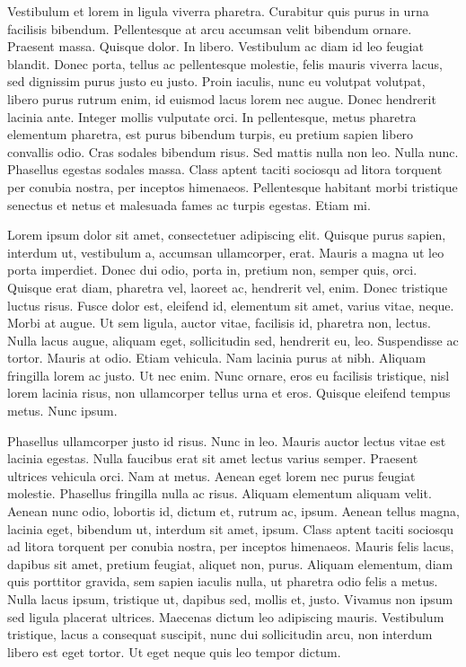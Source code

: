 Vestibulum et lorem in ligula viverra pharetra. Curabitur quis purus
in urna facilisis bibendum. Pellentesque at arcu accumsan velit
bibendum ornare. Praesent massa. Quisque dolor. In libero. Vestibulum
ac diam id leo feugiat blandit. Donec porta, tellus ac pellentesque
molestie, felis mauris viverra lacus, sed dignissim purus justo eu
justo. Proin iaculis, nunc eu volutpat volutpat, libero purus rutrum
enim, id euismod lacus lorem nec augue. Donec hendrerit lacinia
ante. Integer mollis vulputate orci. In pellentesque, metus pharetra
elementum pharetra, est purus bibendum turpis, eu pretium sapien
libero convallis odio. Cras sodales bibendum risus. Sed mattis nulla
non leo. Nulla nunc. Phasellus egestas sodales massa. Class aptent
taciti sociosqu ad litora torquent per conubia nostra, per inceptos
himenaeos. Pellentesque habitant morbi tristique senectus et netus et
malesuada fames ac turpis egestas. Etiam mi. 

Lorem ipsum dolor sit amet, consectetuer adipiscing elit. Quisque
purus sapien, interdum ut, vestibulum a, accumsan ullamcorper,
erat. Mauris a magna ut leo porta imperdiet. Donec dui odio, porta in,
pretium non, semper quis, orci. Quisque erat diam, pharetra vel,
laoreet ac, hendrerit vel, enim. Donec tristique luctus risus. Fusce
dolor est, eleifend id, elementum sit amet, varius vitae, neque. Morbi
at augue. Ut sem ligula, auctor vitae, facilisis id, pharetra non,
lectus. Nulla lacus augue, aliquam eget, sollicitudin sed, hendrerit
eu, leo. Suspendisse ac tortor. Mauris at odio. Etiam vehicula. Nam
lacinia purus at nibh. Aliquam fringilla lorem ac justo. Ut nec
enim. Nunc ornare, eros eu facilisis tristique, nisl lorem lacinia
risus, non ullamcorper tellus urna et eros. Quisque eleifend tempus
metus. Nunc ipsum. 

Phasellus ullamcorper justo id risus. Nunc in leo. Mauris auctor
lectus vitae est lacinia egestas. Nulla faucibus erat sit amet lectus
varius semper. Praesent ultrices vehicula orci. Nam at metus. Aenean
eget lorem nec purus feugiat molestie. Phasellus fringilla nulla ac
risus. Aliquam elementum aliquam velit. Aenean nunc odio, lobortis id,
dictum et, rutrum ac, ipsum. Aenean tellus magna, lacinia eget,
bibendum ut, interdum sit amet, ipsum. Class aptent taciti sociosqu ad
litora torquent per conubia nostra, per inceptos himenaeos. Mauris
felis lacus, dapibus sit amet, pretium feugiat, aliquet non,
purus. Aliquam elementum, diam quis porttitor gravida, sem sapien
iaculis nulla, ut pharetra odio felis a metus. Nulla lacus ipsum,
tristique ut, dapibus sed, mollis et, justo. Vivamus non ipsum sed
ligula placerat ultrices. Maecenas dictum leo adipiscing
mauris. Vestibulum tristique, lacus a consequat suscipit, nunc dui
sollicitudin arcu, non interdum libero est eget tortor. Ut eget neque
quis leo tempor dictum. 

